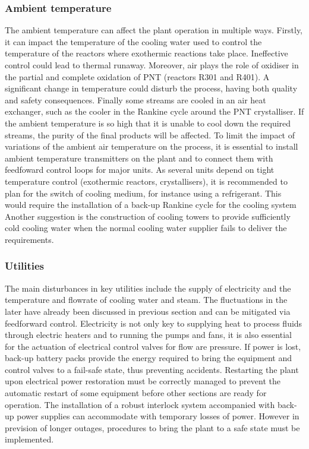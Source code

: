 \subsubsection{Ambient temperature}

The ambient temperature can affect the plant operation in multiple ways. Firstly, it can impact the temperature of the cooling water used to control the temperature of the reactors where exothermic reactions take place. Ineffective control could lead to thermal runaway. Moreover, air plays the role of oxidiser in the partial and complete oxidation of PNT (reactors R301 and R401). A significant change in temperature could disturb the process, having both quality and safety consequences. Finally some streams are cooled in an air heat exchanger, such as the cooler in the Rankine cycle around the PNT crystalliser. If the ambient temperature is so high that it is unable to cool down the required streams, the purity of the final products will be affected. To limit the impact of variations of the ambient air temperature on the process, it is essential to install ambient temperature transmitters on the plant and to connect them with feedfoward control loops for major units. As several units depend on tight temperature control (exothermic reactors, crystallisers), it is recommended to plan for the switch of cooling medium, for instance using a refrigerant. This would require the installation of a back-up Rankine cycle for the cooling system Another suggestion is the construction of cooling towers to provide sufficiently cold cooling water when the normal cooling water supplier fails to deliver the requirements.

\subsubsection{Utilities}

The main disturbances in key utilities include the supply of electricity and the temperature and flowrate of cooling water and steam. The fluctuations in the later have already been discussed in previous section and can be mitigated via feedforward control.
Electricity is not only key to supplying heat to process fluids through electric heaters and to running the pumps and fans, it is also essential for the actuation of electrical control valves for flow are pressure. If power is lost, back-up battery packs provide the energy required to bring the equipment and control valves to a fail-safe state, thus preventing accidents. Restarting the plant upon electrical power restoration must be correctly managed to prevent the automatic restart of some equipment before other sections are ready for operation. The installation of a robust interlock system accompanied with back-up power supplies can accommodate with temporary losses of power. However in prevision of longer outages, procedures to bring the plant to a safe state must be implemented.


